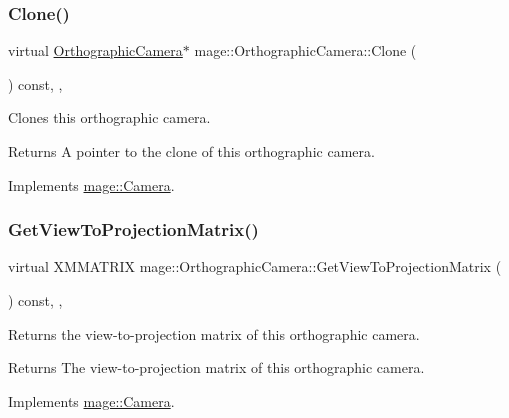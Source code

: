\subsubsection{\texorpdfstring{Clone()}{Clone()}}
{\footnotesize\ttfamily virtual \hyperlink{classmage_1_1_orthographic_camera}{Orthographic\+Camera}$\ast$ mage\+::\+Orthographic\+Camera\+::\+Clone (\begin{DoxyParamCaption}{ }\end{DoxyParamCaption}) const\hspace{0.3cm}{\ttfamily [override]}, {\ttfamily [private]}, {\ttfamily [virtual]}}

Clones this orthographic camera.

\begin{DoxyReturn}{Returns}
A pointer to the clone of this orthographic camera. 
\end{DoxyReturn}


Implements \hyperlink{classmage_1_1_camera_a19301c2256c183db50b5e9406f7b5f3c}{mage\+::\+Camera}.

\hypertarget{classmage_1_1_orthographic_camera_aedd86e56a0f7bc967ad8d9be2631a0cf}{}\label{classmage_1_1_orthographic_camera_aedd86e56a0f7bc967ad8d9be2631a0cf} 
\subsubsection{\texorpdfstring{Get\+View\+To\+Projection\+Matrix()}{GetViewToProjectionMatrix()}}
{\footnotesize\ttfamily virtual X\+M\+M\+A\+T\+R\+IX mage\+::\+Orthographic\+Camera\+::\+Get\+View\+To\+Projection\+Matrix (\begin{DoxyParamCaption}{ }\end{DoxyParamCaption}) const\hspace{0.3cm}{\ttfamily [override]}, {\ttfamily [private]}, {\ttfamily [virtual]}}

Returns the view-\/to-\/projection matrix of this orthographic camera.

\begin{DoxyReturn}{Returns}
The view-\/to-\/projection matrix of this orthographic camera. 
\end{DoxyReturn}


Implements \hyperlink{classmage_1_1_camera_a1f5206864cf18b5548219492556df5d2}{mage\+::\+Camera}.

